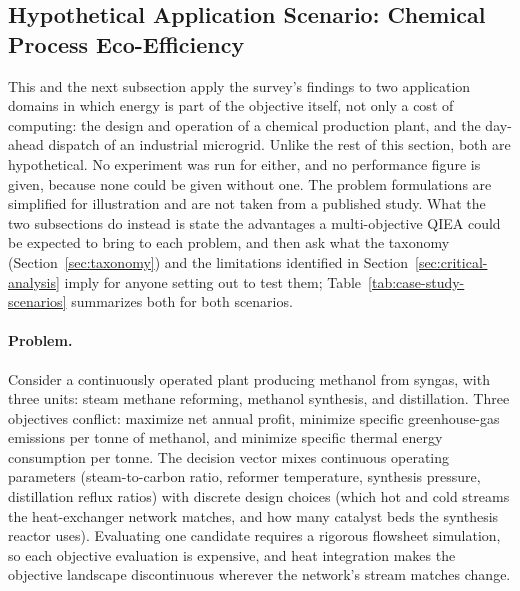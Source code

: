 \subsection{Hypothetical Application Scenario: Chemical Process Eco-Efficiency}
\label{sec:case-study:scenario-chemistry}

This and the next subsection apply the survey's findings to two
application domains in which energy is part of the objective itself,
not only a cost of computing: the design and operation of a chemical
production plant, and the day-ahead dispatch of an industrial
microgrid. Unlike the rest of this section, both are hypothetical. No
experiment was run for either, and no performance figure is given,
because none could be given without one. The problem formulations are
simplified for illustration and are not taken from a published study.
What the two subsections do instead is state the advantages a
multi-objective QIEA could be expected to bring to each problem, and
then ask what the taxonomy (Section~\ref{sec:taxonomy}) and the
limitations identified in Section~\ref{sec:critical-analysis} imply for
anyone setting out to test them; Table~\ref{tab:case-study-scenarios}
summarizes both for both scenarios.

\paragraph{Problem.}
Consider a continuously operated plant producing methanol from syngas,
with three units:
steam methane reforming, methanol synthesis, and distillation. Three
objectives conflict: maximize net annual profit, minimize specific
greenhouse-gas emissions per tonne of methanol, and minimize specific
thermal energy consumption per tonne. The decision vector mixes
continuous operating parameters (steam-to-carbon ratio, reformer
temperature, synthesis pressure, distillation reflux ratios) with
discrete design choices (which hot and cold streams the heat-exchanger
network matches, and how many catalyst beds the synthesis reactor uses).
Evaluating one candidate requires a rigorous flowsheet simulation, so
each objective evaluation is expensive, and heat integration makes the
objective landscape discontinuous wherever the network's stream matches
change.

